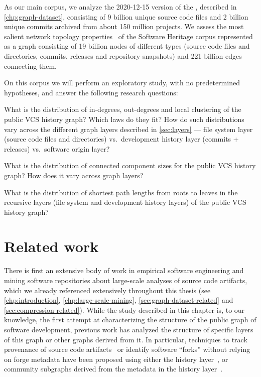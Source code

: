 As our main corpus, we analyze the 2020-12-15 version of the \SWHGD{},
described in \cref{chp:graph-dataset}, consisting of 9 billion unique source
code files and 2 billion unique commits archived from about 150 million
projects.  We assess the most salient network topology
properties~\cite{barabasi2002networkstats} of the Software Heritage corpus
represented as a graph consisting of 19 billion nodes of different types
(source code files and directories, commits, releases and repository snapshots)
and 221 billion edges connecting them.

On this corpus we will perform an exploratory study, with no predetermined
hypotheses, and answer the following research questions:

\begin{researchquestion}%
\label{rq:degrees}
What is the distribution of in-degrees, out-degrees and local clustering of the
public VCS history graph? Which laws do they fit?
How do such distributions vary across the different graph layers described in
\cref{sec:layers} --- file system layer (source code files and directories)
vs.\ development history layer (commits + releases) vs.\ software origin
layer?
\end{researchquestion}

\begin{researchquestion}%
\label{rq:ccs}
What is the distribution of connected component sizes for the public VCS
history graph?  How does it vary across graph layers?
\end{researchquestion}

\begin{researchquestion}%
\label{rq:paths}
What is the distribution of shortest path lengths from roots to leaves in the
recursive layers (file system and development history layers) of the public VCS
history graph?
\end{researchquestion}


\section{Related work}%
\label{sec:topology-related}

There is first an extensive body of work in empirical software engineering and
mining software repositories about large-scale analyses of source code
artifacts, which we already referenced extensively throughout this thesis (see
\cref{chp:introduction}, \cref{chp:large-scale-mining},
\cref{sec:graph-dataset-related} and \cref{sec:compression-related}).
While the study described in this chapter is, to our knowledge, the first
attempt at characterizing the structure of the public graph of software
development, previous work has analyzed the structure of specific layers of
this graph or other graphs derived from it. In particular, techniques to track
provenance of source code artifacts~\cite{swh-provenance-emse} or identify
software ``forks'' without relying on forge metadata have been proposed using
either the history layer~\cite{swh-msr2020-forking}, or community subgraphs
derived from the metadata in the history layer~\cite{mockus2020complete}.

